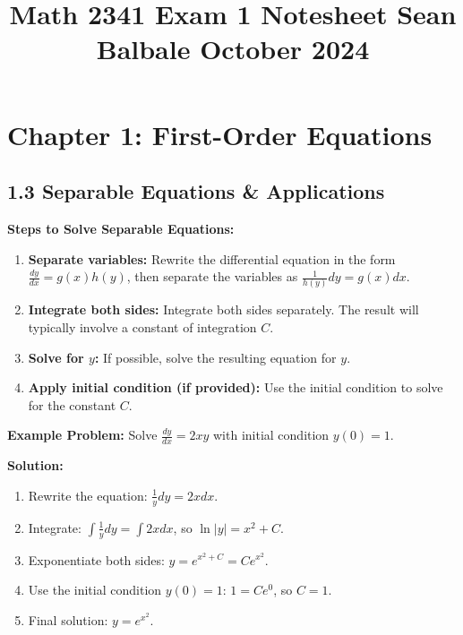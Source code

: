 \documentclass[10pt]{article}
\title{
    \raggedright
    \large Math 2341 Exam 1 Notesheet \hfill Sean Balbale \hfill October 2024
    \vspace{-4em}
}
\date{}
\begin{document}
\maketitle

\section*{Chapter 1: First-Order Equations}

\subsection*{1.3 Separable Equations \& Applications}
\textbf{Steps to Solve Separable Equations:}
\begin{enumerate}
    \item \textbf{Separate variables:} Rewrite the differential equation in the form \( \frac{dy}{dx} = g(x) h(y) \), then separate the variables as \( \frac{1}{h(y)} dy = g(x) dx \).
    \item \textbf{Integrate both sides:} Integrate both sides separately. The result will typically involve a constant of integration \( C \).
    \item \textbf{Solve for \( y \):} If possible, solve the resulting equation for \( y \).
    \item \textbf{Apply initial condition (if provided):} Use the initial condition to solve for the constant \( C \).
\end{enumerate}

\textbf{Example Problem:} Solve \( \frac{dy}{dx} = 2xy \) with initial condition \( y(0) = 1 \).

\textbf{Solution:}
\begin{enumerate}
    \item Rewrite the equation: \( \frac{1}{y} dy = 2x dx \).
    \item Integrate: \( \int \frac{1}{y} dy = \int 2x dx \), so \( \ln |y| = x^2 + C \).
    \item Exponentiate both sides: \( y = e^{x^2 + C} = Ce^{x^2} \).
    \item Use the initial condition \( y(0) = 1 \): \( 1 = Ce^{0} \), so \( C = 1 \).
    \item Final solution: \( y = e^{x^2} \).
\end{enumerate}
\end{document}
